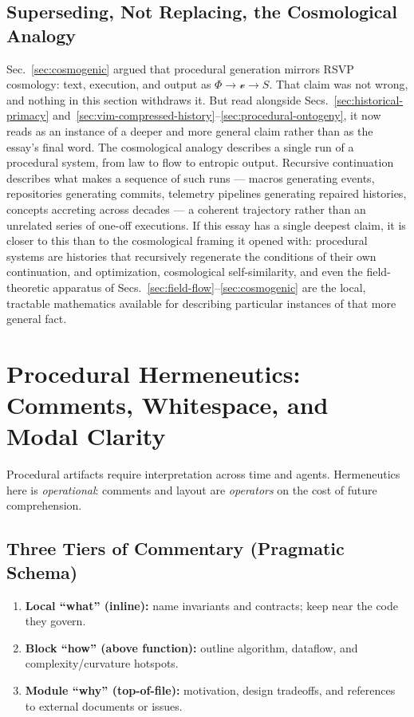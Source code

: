 \documentclass[12pt,a4paper]{article}
\theoremstyle{plain}
\theoremstyle{definition}
\theoremstyle{remark}
\newcommand{\Phifield}{\Phi}
\newcommand{\vfield}{\mathcal{v}}
\newcommand{\Sfield}{S}
\begin{document}
\subsection{Superseding, Not Replacing, the Cosmological Analogy}
\label{subsec:superseding-cosmology}

Sec.~\ref{sec:cosmogenic} argued that procedural generation mirrors RSVP cosmology: text, execution, and output as $\Phifield \to \vfield \to \Sfield$. That claim was not wrong, and nothing in this section withdraws it. But read alongside Secs.~\ref{sec:historical-primacy} and~\ref{sec:vim-compressed-history}--\ref{sec:procedural-ontogeny}, it now reads as an instance of a deeper and more general claim rather than as the essay's final word. The cosmological analogy describes a single run of a procedural system, from law to flow to entropic output. Recursive continuation describes what makes a sequence of such runs — macros generating events, repositories generating commits, telemetry pipelines generating repaired histories, concepts accreting across decades — a coherent trajectory rather than an unrelated series of one-off executions. If this essay has a single deepest claim, it is closer to this than to the cosmological framing it opened with: procedural systems are histories that recursively regenerate the conditions of their own continuation, and optimization, cosmological self-similarity, and even the field-theoretic apparatus of Secs.~\ref{sec:field-flow}--\ref{sec:cosmogenic} are the local, tractable mathematics available for describing particular instances of that more general fact.

\section{Procedural Hermeneutics: Comments, Whitespace, and Modal Clarity}
\label{sec:procedural-hermeneutics}

Procedural artifacts require interpretation across time and agents. Hermeneutics here is \emph{operational}: comments and layout are \emph{operators} on the cost of future comprehension.

\subsection{Three Tiers of Commentary (Pragmatic Schema)}
\begin{enumerate}
  \item \textbf{Local “what” (inline):} name invariants and contracts; keep near the code they govern.
  \item \textbf{Block “how” (above function):} outline algorithm, dataflow, and complexity/curvature hotspots.
  \item \textbf{Module “why” (top-of-file):} motivation, design tradeoffs, and references to external documents or issues.
\end{enumerate}
\end{document}
